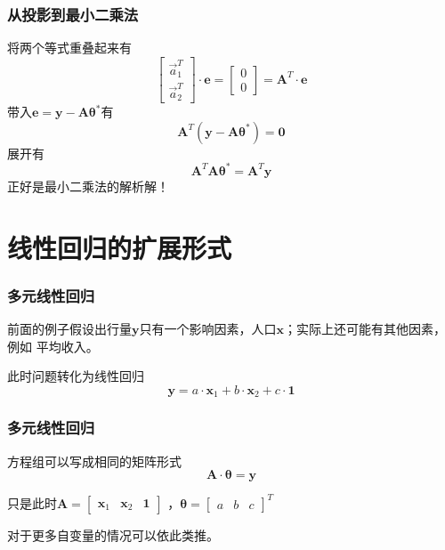 \documentclass[14pt]{beamer}
\newcommand{\mat}[1]{\bm{#1}}
\renewcommand{\vec}[1]{\bm{#1}}
\newcommand{\MA}{\mat{A}}
\newcommand{\Va}{\Vec{a}}
\newcommand{\Vy}{\vec{y}}
\newcommand{\Vx}{\vec{x}}
\newcommand{\Ve}{\vec{e}}
\newcommand{\Vt}{\vec{\theta}}
\let\emph\relax %
\begin{document}
    \begin{frame}
        \frametitle{从投影到最小二乘法}
        将两个等式重叠起来有
        \begin{equation}
            \begin{bmatrix}
                \Va_1^T\\
                \Va_2^T
            \end{bmatrix}\cdot
            \Ve=\begin{bmatrix}
                0\\
                0
            \end{bmatrix}=
            \MA^T\cdot \Ve
        \end{equation}
        带入$\Ve=\Vy-\MA\Vt^*$有
        \begin{equation}
            \MA^T(\Vy-\MA\Vt^*)=\vec{0}
        \end{equation}
        展开有
        \[ \boxed{\MA^T\MA\Vt^*=\MA^T\Vy} \]
        正好是最小二乘法的解析解！
    \end{frame}

    \section{线性回归的扩展形式}

    \begin{frame}
        \frametitle{多元线性回归}
        前面的例子假设出行量$\Vy$只有一个影响因素，人口$\Vx$；实际上还可能有其他因素，例如
        平均收入。
        
        此时问题转化为\emph{多元}线性回归
        \begin{equation}
            \Vy = a\cdot\Vx_1+b\cdot\Vx_2+c\cdot\vec{1}
        \end{equation}
    \end{frame}

    \begin{frame}
        \frametitle{多元线性回归}
        方程组可以写成相同的矩阵形式
        \begin{equation}
            \MA\cdot\Vt=\Vy
        \end{equation}
        
        只是此时$\MA=\begin{bmatrix}
                \Vx_1 & \Vx_2 & \vec{1}
            \end{bmatrix}$
            ，$\Vt=\begin{bmatrix}a&b&c\end{bmatrix}^T$

        对于更多自变量的情况可以依此类推。
    \end{frame}
\end{document}
